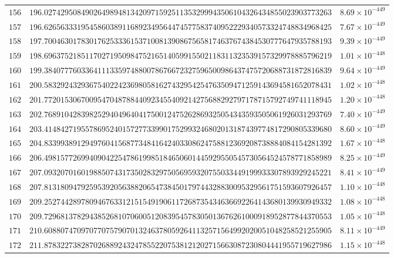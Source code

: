 \documentclass[12pt,reqno]{amsart}
\theoremstyle{remark}
\begin{document}
\begin{longtable}{clc}
$156$ & $196.0274295084902649894813420971592511353299943506104326434855023903773263$ & $8.69\times 10^{-449}$ \\
$157$ & $196.6265633319545860389116892349564474577583740952229340573324748834968425$ & $7.67\times 10^{-449}$ \\
$158$ & $197.7004630178301762533361537100813908675658174637674384530777647935788193$ & $9.39\times 10^{-449}$ \\
$159$ & $198.6963752185117027195098475216514059915502118311323539157329978885796219$ & $1.01\times 10^{-448}$ \\
$160$ & $199.3840777603364111335974880078676672327596500986437475720688731872816839$ & $9.64\times 10^{-449}$ \\
$161$ & $200.5832924329367540224236980581627432954254763509471259143694581652078431$ & $1.02\times 10^{-448}$ \\
$162$ & $201.7720153067009547048788440923455409214275688292797178715792749741118945$ & $1.20\times 10^{-448}$ \\
$163$ & $202.7689104283982529404964041750012475262869325054343593505061926031293769$ & $7.40\times 10^{-449}$ \\
$164$ & $203.4148427195578695240157277339901752993246802013187439774817290805339680$ & $8.60\times 10^{-449}$ \\
$165$ & $204.8339938912949760415687734841642403308624758812369208738884084154281392$ & $1.67\times 10^{-448}$ \\
$166$ & $206.4981577269940904225478619985184650601445929550545730564524578771858989$ & $8.25\times 10^{-449}$ \\
$167$ & $207.0932070160198850743173502832975056959320755033449199933307893929245221$ & $8.41\times 10^{-449}$ \\
$168$ & $207.8131809479259539205638820654738450179744328830095329561751593607926457$ & $1.10\times 10^{-448}$ \\
$169$ & $209.2527442897809467633121515491906117268735434636692264143680139930949332$ & $1.08\times 10^{-448}$ \\
$170$ & $209.7296813782943852681070600512083954578305013676261000918952877844370553$ & $1.05\times 10^{-448}$ \\
$171$ & $210.6088074709707707579070132463780592641132571564992020051048258521255905$ & $8.11\times 10^{-449}$ \\
$172$ & $211.8783227382870268892432478552207538121202715663087230804441955719627986$ & $1.15\times 10^{-448}$ \\

\end{longtable}
\end{document}
